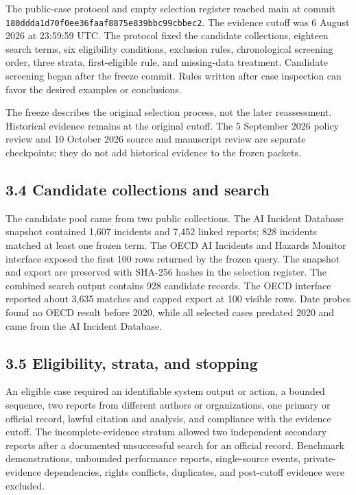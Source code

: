 \documentclass[11pt]{article}
\begin{document}
The public-case protocol and empty selection register reached main at commit \texttt{180ddda1\allowbreak{}d70f0ee3\allowbreak{}6faaf887\allowbreak{}5e839bbc\allowbreak{}99cbbec2}. The evidence cutoff was 6 August 2026 at 23:59:59 UTC. The protocol fixed the candidate collections, eighteen search terms, six eligibility conditions, exclusion rules, chronological screening order, three strata, first-eligible rule, and missing-data treatment. Candidate screening began after the freeze commit. Rules written after case inspection can favor the desired examples or conclusions.

The freeze describes the original selection process, not the later reassessment. Historical evidence remains at the original cutoff. The 5 September 2026 policy review and 10 October 2026 source and manuscript review are separate checkpoints; they do not add historical evidence to the frozen packets.

\subsection*{3.4 Candidate collections and search}

The candidate pool came from two public collections. The AI Incident Database snapshot contained 1,607 incidents and 7,452 linked reports; 828 incidents matched at least one frozen term. The OECD AI Incidents and Hazards Monitor interface exposed the first 100 rows returned by the frozen query. The snapshot and export are preserved with SHA-256 hashes in the selection register. The combined search output contains 928 candidate records. The OECD interface reported about 3,635 matches and capped export at 100 visible rows. Date probes found no OECD result before 2020, while all selected cases predated 2020 and came from the AI Incident Database.

\subsection*{3.5 Eligibility, strata, and stopping}

An eligible case required an identifiable system output or action, a bounded sequence, two reports from different authors or organizations, one primary or official record, lawful citation and analysis, and compliance with the evidence cutoff. The incomplete-evidence stratum allowed two independent secondary reports after a documented unsuccessful search for an official record. Benchmark demonstrations, unbounded performance reports, single-source events, private-evidence dependencies, rights conflicts, duplicates, and post-cutoff evidence were excluded.
\end{document}
